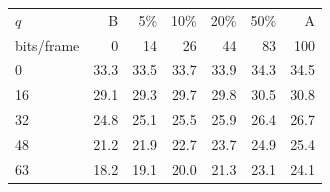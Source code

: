 \begin{tabular}{lrrrrrr}
\toprule
$q$ & B & 5\% & 10\% & 20\% & 50\% & A \\
bits/frame & 0 & 14 & 26 & 44 & 83 & 100 \\
\midrule
0 & 33.3 & 33.5 & 33.7 & 33.9 & 34.3 & 34.5 \\
16 & 29.1 & 29.3 & 29.7 & 29.8 & 30.5 & 30.8 \\
32 & 24.8 & 25.1 & 25.5 & 25.9 & 26.4 & 26.7 \\
48 & 21.2 & 21.9 & 22.7 & 23.7 & 24.9 & 25.4 \\
63 & 18.2 & 19.1 & 20.0 & 21.3 & 23.1 & 24.1 \\
\bottomrule
\end{tabular}
